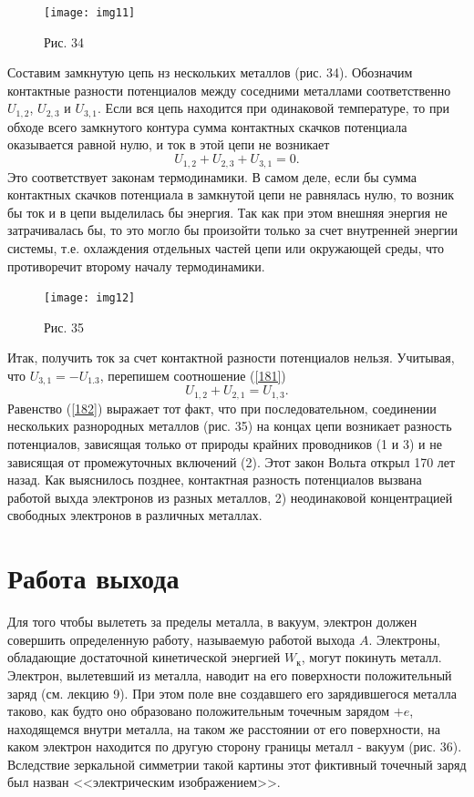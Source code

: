\documentclass[a4paper,10pt]{book}
\begin{document}
\begin{figure}[h]
\texttt{[image: img11]}
\caption{Рис. 34}
\label{img11}
\end{figure}
Составим замкнутую цепь нз нескольких металлов (рис. 34). Обозначим контактные разности потенциалов между соседними металлами соответственно $U_{1,2}$, $U_{2,3}$ и $U_{3,1}$. Если вся цепь находится при одинаковой температуре, то при обходе всего замкнутого контура сумма контактных скачков потенциала оказывается равной нулю, и ток в этой цепи не возникает 
\begin{equation}\label{181}
 U_{1,2} + U_{2,3} + U_{3,1} = 0.
\end{equation}
Это соответствует законам термодинамики. В самом деле, если бы сумма контактных скачков потенциала в замкнутой цепи не равнялась нулю, то возник бы ток и в цепи выделилась бы энергия. Так как при этом внешняя энергия не затрачивалась бы, то это могло бы произойти только за счет внутренней энергии системы, т.е. охлаждения отдельных частей цепи или окружающей среды, что противоречит второму началу термодинамики.
\begin{figure}[h]
\texttt{[image: img12]}
\caption{Рис. 35}
\label{img12}
\end{figure}
Итак, получить ток за счет контактной разности потенциалов нельзя. Учитывая, что $U_{3,1} = -U_{1.3}$, перепишем соотношение (\ref{181})
\begin{equation}\label{182}
 U_{1,2} + U_{2,1} = U_{1,3}.
\end{equation}
Равенство (\ref{182}) выражает тот факт, что при последовательном, соединении нескольких разнородных металлов (рис. 35) на концах цепи возникает разность потенциалов, зависящая только от природы крайних проводников (1 и 3) и не зависящая от промежуточных включений (2). Этот закон Вольта открыл 170 лет назад. Как выяснилось позднее, контактная разность потенциалов вызвана работой выхда электронов из разных металлов, 2) неодинаковой концентрацией свободных электронов в различных металлах.
\section{Работа выхода}
Для того чтобы вылететь за пределы металла, в вакуум, электрон должен совершить определенную работу, называемую работой выхода $A$. Электроны, обладающие достаточной кинетической энергией $W_\text{к}$, могут покинуть металл. Электрон, вылетевший из металла, наводит на его поверхности положительный заряд (см. лекцию 9). При этом поле вне создавшего его зарядившегося металла таково, как будто оно образовано положительным точечным зарядом $+e$, находящемся внутри металла, на таком же расстоянии от его поверхности, на каком электрон находится по другую сторону границы металл - вакуум (рис. 36). Вследствие зеркальной симметрии такой картины этот фиктивный точечный заряд был назван <<электрическим изображением>>.
\end{document}
